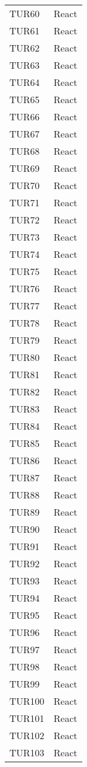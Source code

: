 \documentclass[PianoDiQualifica.tex]{subfiles}
\begin{document}
\begin{longtable}[H]{P{5cm}P{9cm}}
	TUR60 & React \\ 
	TUR61 & React \\ 
	TUR62 & React \\ 
	TUR63 & React \\ 
	TUR64 & React \\ 
	TUR65 & React \\ 
	TUR66 & React \\ 
	TUR67 & React \\ 
	TUR68 & React \\ 
	TUR69 & React \\ 
	TUR70 & React \\ 
	TUR71 & React \\ 
	TUR72 & React \\ 
	TUR73 & React \\ 
	TUR74 & React \\ 
	TUR75 & React \\ 
	TUR76 & React \\ 
	TUR77 & React \\ 
	TUR78 & React \\ 
	TUR79 & React \\ 
	TUR80 & React \\ 
	TUR81 & React \\ 
	TUR82 & React \\ 
	TUR83 & React \\ 
	TUR84 & React \\ 
	TUR85 & React \\ 
	TUR86 & React \\ 
	TUR87 & React \\ 
	TUR88 & React \\ 
	TUR89 & React \\ 
	TUR90 & React \\ 
	TUR91 & React \\ 
	TUR92 & React \\ 
	TUR93 & React \\ 
	TUR94 & React \\ 
	TUR95 & React \\ 
	TUR96 & React \\ 
	TUR97 & React \\ 
	TUR98 & React \\ 
	TUR99 & React \\ 
	TUR100 & React \\ 
	TUR101 & React \\ 
	TUR102 & React \\ 
	TUR103 & React \\ 

\end{longtable}
\end{document}
